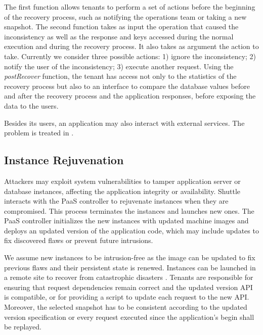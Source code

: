 The first function allows tenants to perform a set of actions before the beginning of the recovery process, such as notifying the operations team or taking a new snapshot. 
The second function takes as input the operation that caused the inconsistency as well as the response and keys accessed during the normal execution and during the recovery process. It also takes as argument the action to take. Currently we consider three possible actions: 1) ignore the inconsistency; 2) notify the user of the inconsistency; 3) execute another request. 
Using the \textit{postRecover} function, the tenant has access not only to the statistics of the recovery process but also to an interface to compare the database values before and after the recovery process and the application responses, before exposing the data to the users. 

Besides its users, an application may also interact with external services. The problem is treated in \cite{aire,undoForOperators}. 



\subsection{Instance Rejuvenation}
\label{sec:recovery:instance_rejuventaion}
Attackers may exploit system vulnerabilities to tamper application server or database instances, affecting the application integrity or availability. Shuttle interacts with the \ac{PaaS} controller to rejuvenate instances when they are compromised. This process terminates the instances and launches new ones. The PaaS controller initializes the new instances with updated machine images and deploys an updated version of the application code, which may include updates to fix discovered flaws or prevent future intrusions.

We assume new instances to be intrusion-free as the image can be updated to fix previous flaws and their persistent state is renewed. Instances can be launched in a remote site to recover from catastrophic disasters \cite{cloud-disaster}. Tenants are responsible for ensuring that request dependencies remain correct and the updated version API is compatible, or for providing a script to update each request to the new API. Moreover, the selected snapshot has to be consistent according to the updated version specification or every request executed since the application's begin shall be replayed.

